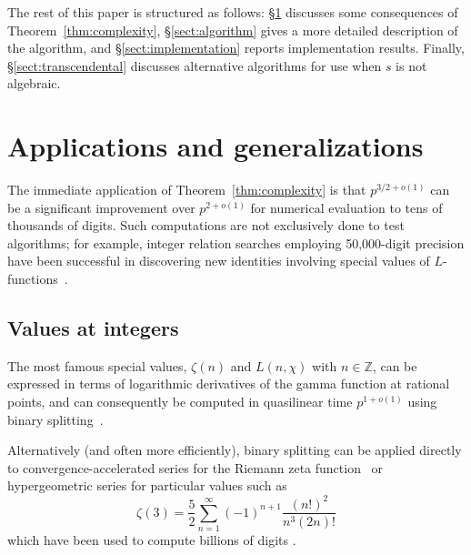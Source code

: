 \documentclass[reqno]{amsart}
\newcommand{\Imag}{\operatorname{Im}}
\newcommand{\ZZ}{\mathbb{Z}}
\newcommand{\be}{\begin{equation}}
\newcommand{\ee}{\end{equation}}
\theoremstyle{definition}
\begin{document}
The rest of this paper is structured as follows:
\S \ref{sect:applications} discusses some consequences
of Theorem~\ref{thm:complexity}, \S \ref{sect:algorithm} gives a more
detailed description of the algorithm,
and \S \ref{sect:implementation} reports
implementation results.
Finally, \S \ref{sect:transcendental} discusses alternative
algorithms for use when $s$ is not algebraic.




\section{Applications and generalizations}

\label{sect:applications}

The immediate application of Theorem~\ref{thm:complexity} is
that $p^{3/2+o(1)}$ can be a significant improvement
over $p^{2+o(1)}$ for numerical evaluation
to tens of thousands of digits.
Such computations are not exclusively done to test algorithms; for
example, integer relation searches
employing 50,000-digit precision have been
successful in discovering new identities
involving special values of $L$-functions~\cite{Bailey2001}.

\subsection{Values at integers}

The most famous special values, $\zeta(n)$ and $L(n,\chi)$ with $n \in \ZZ$,
can be expressed in terms of
logarithmic derivatives
of the gamma function at rational points,
and can consequently be computed in
quasilinear time $p^{1+o(1)}$
using binary splitting~\cite{Karatsuba1998,johansson2021arbitrary}.

Alternatively (and often more efficiently),
binary splitting can be applied
directly to convergence-accelerated series for the Riemann zeta function~\cite[\S 4.7]{Johansson2014thesis}
or hypergeometric series for particular values such as
\be
\zeta(3) = \frac{5}{2} \sum_{n=1}^{\infty} (-1)^{n+1} \frac{(n!)^2}{n^3 (2n)!}
\ee
which have been used to compute billions of digits \cite{sebah2003zeta,Yee2021}.
\end{document}
